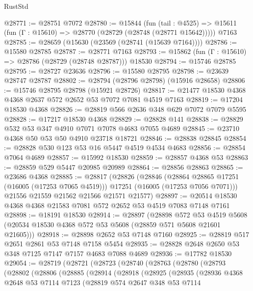 \begin{lexlean}{RustStd}
\begin{coremodule}
@28771 := @28751 @7072
@28780 := @15844
    (fun (tail : @4525) => @15611 (fun (Γ : @15610) => @28770 (@28729 (@28748 (@28771 @15642)))))
    @7163
@28785 := @28659 (@15630 (@23569 (@28741 (@15639 @7164))))
@28786 := @15580 @28785
@28787 := @28771 @7163
@28793 := @15862 (fun (Γ : @15610) => @28786 (@28729 (@28748 @28787))) @18530
@28794 := @15746 @28785
@28795 := @28727 @23636
@28796 := @15580 @28795
@28798 := @23639 @28747 @28787
@28802 := @28794 (@28796 @28798) (@15916 @28658)
@28806 := @15746 @28795 @28798 (@15921 @28726)
@28817 := @21477 @18530 @4368 @4368 @2637 @572 @2652 @53 @7072 @7081 @4519 @7163
@28819 := @17204 @18530 @4368
@28826 := @28819 @566 @2636 @348 @629 @7072 @7079 @5595
@28828 := @17217 @18530 @4368
@28829 := @28828 @141
@28838 := @28829 @532 @53 @347 @4910 @7071 @7078 @4683 @7055 @4689
@28845 := @23710 @4368 @50 @53 @50 @4910 @23718 @18721
@28846 := @28838 @28845
@28854 := @28828 @530 @123 @53 @16 @5447 @4519 @4534 @4683
@28856 := @28854 @7064 @4689
@28857 := @15992 @18530
@28859 := @28857 @4368 @53
@28863 := @28859 @529 @5447 @20985 @20989
@28864 := @28856 @28863
@28865 := @23686 @4368
@28885 := @28817
    (@28826
      (@28846
        (@28864 @28865 @17251 (@16005 (@17253 @7065 @4519)))
        @17251
        (@16005 (@17253 @7056 @7071)))
      @21556
      @21559
      @21562
      @21566
      @21571
      @21577)
@28897 := @20514 @18530 @4368 @4368 @21583 @7081 @572 @2652 @53 @4519 @7083 @7148 @7161
@28898 := @18191 @18530
@28914 := @28897
    (@28898
      @572
      @53
      @4519
      @5608
      (@20534 @18530 @4368 @572 @53 @5608 (@28859 @571 @5608 @21601 @21605)))
@28918 := @28898 @2652 @53 @7148 @7160
@28925 := @28819 @517 @2651 @2861 @53 @7148 @7158 @5454
@28935 := @28828 @2648 @2650 @53 @348 @7125 @7147 @7157 @4683 @7088 @4689
@28936 := @17782 @18530
@29054 := @28719
    (@28721
      (@28723
        (@28740
          (@28763
            (@28780
              (@28793
                (@28802
                  (@28806
                    (@28885
                      (@28914
                        (@28918
                          (@28925
                            (@28935
                              (@28936
                                @4368
                                @2648
                                @53
                                @7114
                                @7123
                                (@28819
                                  @574
                                  @2647
                                  @348
                                  @53
                                  @7114

\end{coremodule}
\end{lexlean}
